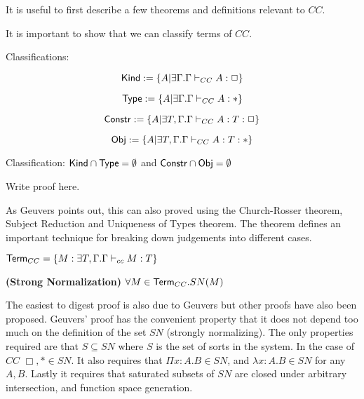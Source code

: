 It is useful to first describe a few theorems and definitions relevant to $CC$.  

It is important to show that we can classify \citep{Geuvers94ashort} terms of $CC$.

\begin{definition}
Classifications:

\[
\mathsf{Kind} := \{ A | \exists \Gamma . \Gamma \vdash_{CC} A : \Box \}
\]

\[
\mathsf{Type} := \{ A | \exists \Gamma . \Gamma \vdash_{CC} A : * \}
\]

\[
\mathsf{Constr} := \{ A | \exists T,\Gamma . \Gamma \vdash_{CC} A : T:\Box \}
\]

\[
\mathsf{Obj} := \{ A | \exists T,\Gamma . \Gamma \vdash_{CC} A : T:* \}
\]

\end{definition}

\begin{theorem}
Classification:
$\mathsf{Kind}\cap \mathsf{Type} = \emptyset$ 
and
$\mathsf{Constr}\cap \mathsf{Obj} = \emptyset$ 
\end{theorem}

Write proof here.

As Geuvers points out, this can also proved using the Church-Rosser theorem, 
Subject Reduction and Uniqueness of Types theorem.  
The theorem defines an important technique for breaking down judgements into
different cases.

\begin{definition}
$ \mathsf{Term}_{CC}  = \{ M : \exists T,\Gamma . \Gamma \vdash_{cc} M : T \}$
\end{definition}

\begin{theorem}
\textbf{(Strong Normalization)} $\forall M \in \mathsf{Term}_{CC}. SN(M)$
\end{theorem}

The easiest to digest proof is also due to Geuvers \citep{Geuvers94ashort} 
but other proofs have also been proposed.  Geuvers' proof has the convenient
property that it does not depend too much on the definition of the set $SN$ 
(strongly normalizing). The only properties required are that $S \subseteq SN$ 
where $S$ is the set of sorts in the system. In the case of $CC$ $\Box,* \in SN$.
It also requires that $\Pi x : A . B \in SN$, and $\lambda x : A . B \in SN$ 
for any $A,B$.  Lastly it requires that saturated subsets of $SN$ are closed under
arbitrary intersection, and function space generation.

